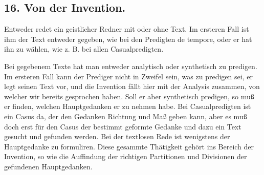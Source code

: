 \subsection*{16. Von der Invention.}

Entweder redet ein geistlicher Redner mit oder ohne Text. Im ersteren Fall ist ihm der Text entweder gegeben, wie bei den Predigten de tempore, oder er hat ihn zu wählen, wie z. B. bei allen Casualpredigten.

Bei gegebenem Texte hat man entweder analytisch oder synthetisch zu predigen. Im ersteren Fall kann der Prediger nicht in Zweifel sein, was zu predigen sei, er legt seinen Text vor, und die Invention fällt hier mit der Analysis zusammen, von welcher wir bereits gesprochen haben. Soll er aber synthetisch predigen, so muß er finden, welchen Hauptgedanken er zu nehmen habe. Bei Casualpredigten ist ein Casus da, der den Gedanken Richtung und Maß geben kann, aber es muß doch erst für den Casus der bestimmt geformte Gedanke und dazu ein Text gesucht und gefunden werden. Bei der textlosen Rede ist wenigstens der Hauptgedanke zu formuliren. Diese gesammte Thätigkeit gehört ins Bereich der Invention, so wie die Auffindung der richtigen Partitionen und Divisionen der gefundenen Hauptgedanken.

